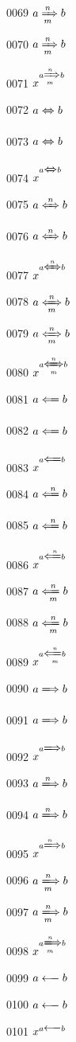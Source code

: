 \documentclass{article}
\begin{document}
0069 $a\xRightarrow[m]{n}b$\par
0070 $\displaystyle a\xRightarrow[m]{n}b$\par
0071 $x^{a\xRightarrow[m]{n}b}$\par
0072 $a\xLeftrightarrow{}b$\par
0073 $\displaystyle a\xLeftrightarrow{}b$\par
0074 $x^{a\xLeftrightarrow{}b}$\par
0075 $a\xLeftrightarrow{n}b$\par
0076 $\displaystyle a\xLeftrightarrow{n}b$\par
0077 $x^{a\xLeftrightarrow{n}b}$\par
0078 $a\xLeftrightarrow[m]{n}b$\par
0079 $\displaystyle a\xLeftrightarrow[m]{n}b$\par
0080 $x^{a\xLeftrightarrow[m]{n}b}$\par
0081 $a\xLongleftarrow{}b$\par
0082 $\displaystyle a\xLongleftarrow{}b$\par
0083 $x^{a\xLongleftarrow{}b}$\par
0084 $a\xLongleftarrow{n}b$\par
0085 $\displaystyle a\xLongleftarrow{n}b$\par
0086 $x^{a\xLongleftarrow{n}b}$\par
0087 $a\xLongleftarrow[m]{n}b$\par
0088 $\displaystyle a\xLongleftarrow[m]{n}b$\par
0089 $x^{a\xLongleftarrow[m]{n}b}$\par
0090 $a\xLongrightarrow{}b$\par
0091 $\displaystyle a\xLongrightarrow{}b$\par
0092 $x^{a\xLongrightarrow{}b}$\par
0093 $a\xLongrightarrow{n}b$\par
0094 $\displaystyle a\xLongrightarrow{n}b$\par
0095 $x^{a\xLongrightarrow{n}b}$\par
0096 $a\xLongrightarrow[m]{n}b$\par
0097 $\displaystyle a\xLongrightarrow[m]{n}b$\par
0098 $x^{a\xLongrightarrow[m]{n}b}$\par
0099 $a\xlongleftarrow{}b$\par
0100 $\displaystyle a\xlongleftarrow{}b$\par
0101 $x^{a\xlongleftarrow{}b}$\par
\end{document}
